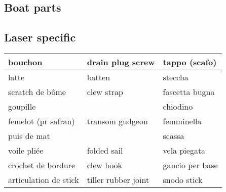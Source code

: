 \documentclass[a4paper, 12pt, twoside]{article}
\begin{document}
\begin{indt}{\section{Boat parts}}
\begin{indt}{\subsection{Laser specific}}
\begin{tabular}{|l|l|l|}
                \hline %
                bouchon %
                & drain plug screw
                & tappo (scafo)
                \\
                \hline %
                latte %
                & batten
                & steccha
                \\
                \hline %
                scratch de bôme %
                & clew strap
                & fascetta bugna
                \\
                \hline %
                goupille %
                &
                & chiodino
                \\
                \hline %
                femelot (pr safran) %
                & transom gudgeon
                & femminella
                \\
                \hline %
                puis de mat %
                &
                & scassa
                \\
                \hline %
                voile pliée %
                & folded sail
                & vela piegata
                \\
                \hline %
                crochet de bordure %
                & clew hook
                & gancio per base
                \\
                \hline %
                articulation de stick %
                & tiller rubber joint
                & snodo stick
                \\
                \hline %
            \end{tabular}
        \end{indt} %


\end{indt}
\end{document}
